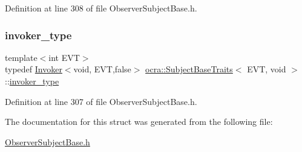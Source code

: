 Definition at line 308 of file Observer\+Subject\+Base.\+h.

\hypertarget{structocra_1_1SubjectBaseTraits_3_01EVT_00_01void_01_4_af6c08a6cdc4753f4246a8eebaf73152c}{}\label{structocra_1_1SubjectBaseTraits_3_01EVT_00_01void_01_4_af6c08a6cdc4753f4246a8eebaf73152c} 
\subsubsection{\texorpdfstring{invoker\+\_\+type}{invoker\_type}}
{\footnotesize\ttfamily template$<$int E\+VT$>$ \\
typedef \hyperlink{classocra_1_1Invoker}{Invoker}$<$void, E\+VT,false$>$ \hyperlink{structocra_1_1SubjectBaseTraits}{ocra\+::\+Subject\+Base\+Traits}$<$ E\+VT, void $>$\+::\hyperlink{structocra_1_1SubjectBaseTraits_3_01EVT_00_01void_01_4_af6c08a6cdc4753f4246a8eebaf73152c}{invoker\+\_\+type}}



Definition at line 307 of file Observer\+Subject\+Base.\+h.



The documentation for this struct was generated from the following file\+:\begin{DoxyCompactItemize}
\item 
\hyperlink{ObserverSubjectBase_8h}{Observer\+Subject\+Base.\+h}\end{DoxyCompactItemize}
